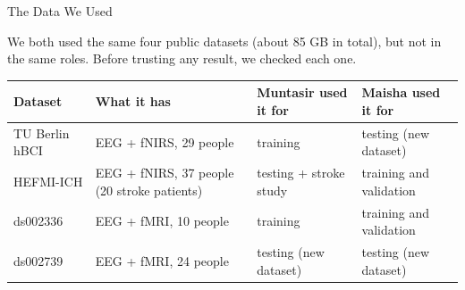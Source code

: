 \documentclass[aspectratio=169,11pt]{beamer}
\begin{document}
\begin{frame}{The Data We Used}
\begin{slidebox}
\small
We both used the same four public datasets (about 85 GB in total), but not in the same roles. Before trusting any result, we checked each one.
\vspace{6pt}

\footnotesize
\begin{tabular}{@{}p{}p{}p{}p{}@{}}
\toprule
\textbf{Dataset} & \textbf{What it has} & \textbf{Muntasir used it for} & \textbf{Maisha used it for} \\
\midrule
TU Berlin hBCI & EEG + fNIRS, 29 people & training & testing (new dataset) \\
HEFMI-ICH & EEG + fNIRS, 37 people (20 stroke patients) & testing + stroke study & training and validation \\
ds002336 & EEG + fMRI, 10 people & training & training and validation \\
ds002739 & EEG + fMRI, 24 people & testing (new dataset) & testing (new dataset) \\
\bottomrule
\end{tabular}
\end{slidebox}
\end{frame}
\end{document}
